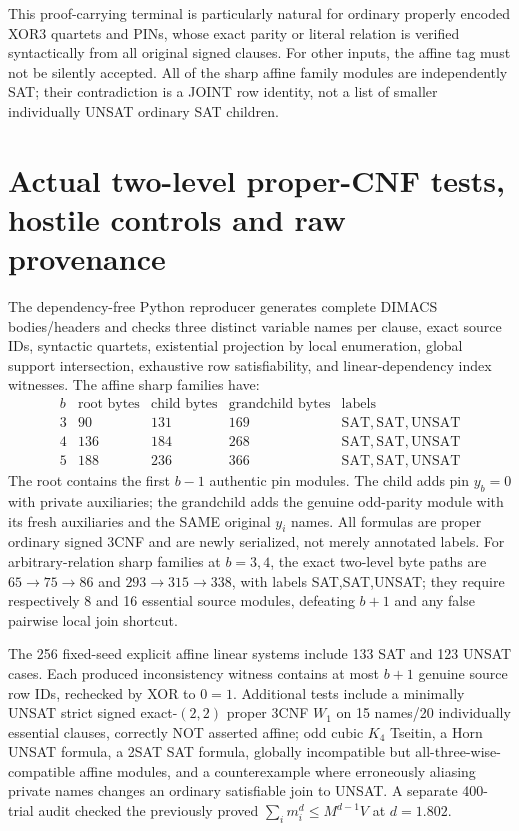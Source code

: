 \documentclass[11pt]{article}
\begin{document}
This proof-carrying terminal is particularly natural for ordinary properly encoded XOR3 quartets and PINs, whose exact parity or literal relation is verified syntactically from all original signed clauses. For other inputs, the affine tag must not be silently accepted. All of the sharp affine family modules are independently SAT; their contradiction is a JOINT row identity, not a list of smaller individually UNSAT ordinary SAT children.

\section{Actual two-level proper-CNF tests, hostile controls and raw provenance}
The dependency-free Python reproducer generates complete DIMACS bodies/headers and checks three distinct variable names per clause, exact source IDs, syntactic quartets, existential projection by local enumeration, global support intersection, exhaustive row satisfiability, and linear-dependency index witnesses. The affine sharp families have:
\[
\begin{array}{c|r|r|r|c}
b&\text{root bytes}&\text{child bytes}&\text{grandchild bytes}&\text{labels}\\\hline
3&90&131&169&\mathrm{SAT,SAT,UNSAT}\\
4&136&184&268&\mathrm{SAT,SAT,UNSAT}\\
5&188&236&366&\mathrm{SAT,SAT,UNSAT}
\end{array}
\]
The root contains the first $b-1$ authentic pin modules. The child adds pin $y_b=0$ with private auxiliaries; the grandchild adds the genuine odd-parity module with its fresh auxiliaries and the SAME original $y_i$ names. All formulas are proper ordinary signed 3CNF and are newly serialized, not merely annotated labels. For arbitrary-relation sharp families at $b=3,4$, the exact two-level byte paths are $65\to75\to86$ and $293\to315\to338$, with labels SAT,SAT,UNSAT; they require respectively 8 and 16 essential source modules, defeating $b+1$ and any false pairwise local join shortcut.

The 256 fixed-seed explicit affine linear systems include 133 SAT and 123 UNSAT cases. Each produced inconsistency witness contains at most $b+1$ genuine source row IDs, rechecked by XOR to $0=1$. Additional tests include a minimally UNSAT strict signed exact-$(2,2)$ proper 3CNF $W_1$ on 15 names/20 individually essential clauses, correctly NOT asserted affine; odd cubic $K_4$ Tseitin, a Horn UNSAT formula, a 2SAT SAT formula, globally incompatible but all-three-wise-compatible affine modules, and a counterexample where erroneously aliasing private names changes an ordinary satisfiable join to UNSAT. A separate 400-trial audit checked the previously proved $\sum_i m_i^d\le M^{d-1}V$ at $d=1.802$.
\end{document}
